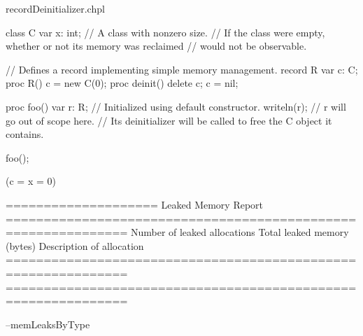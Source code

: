 


\begin{chapelexample}{recordDeinitializer.chpl}
\begin{chapel}
class C { var x: int; } // A class with nonzero size.
// If the class were empty, whether or not its memory was reclaimed 
// would not be observable.

// Defines a record implementing simple memory management.
record R {
  var c: C;
  proc R() { c = new C(0); }
  proc deinit() { delete c; c = nil; }
}

proc foo()
{
  var r: R; // Initialized using default constructor.
  writeln(r);
  // r will go out of scope here.
  // Its deinitializer will be called to free the C object it contains.
}

foo();
\end{chapel}
\begin{chapeloutput}
(c = {x = 0})

====================
Leaked Memory Report
==============================================================
Number of leaked allocations
           Total leaked memory (bytes)
                      Description of allocation
==============================================================
==============================================================
\end{chapeloutput}
\begin{chapelexecopts}
--memLeaksByType
\end{chapelexecopts}
\end{chapelexample}


